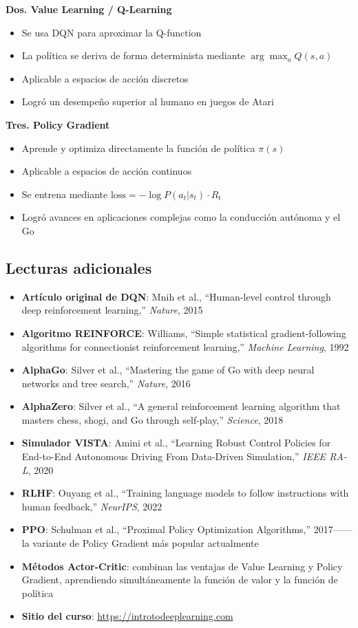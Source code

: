 \documentclass[a4paper]{article}
\begin{document}
\textbf{Dos. Value Learning / Q-Learning}
\begin{itemize}
    \item Se usa DQN para aproximar la Q-function
    \item La política se deriva de forma determinista mediante $\arg\max_a Q(s,a)$
    \item Aplicable a espacios de acción discretos
    \item Logró un desempeño superior al humano en juegos de Atari
\end{itemize}

\textbf{Tres. Policy Gradient}
\begin{itemize}
    \item Aprende y optimiza directamente la función de política $\pi(s)$
    \item Aplicable a espacios de acción continuos
    \item Se entrena mediante $\text{loss} = -\log P(a_t|s_t) \cdot R_t$
    \item Logró avances en aplicaciones complejas como la conducción autónoma y el Go
\end{itemize}

\subsection{Lecturas adicionales}

\begin{itemize}
    \item \textbf{Artículo original de DQN}: Mnih et al., ``Human-level control through deep reinforcement learning,'' \textit{Nature}, 2015
    \item \textbf{Algoritmo REINFORCE}: Williams, ``Simple statistical gradient-following algorithms for connectionist reinforcement learning,'' \textit{Machine Learning}, 1992
    \item \textbf{AlphaGo}: Silver et al., ``Mastering the game of Go with deep neural networks and tree search,'' \textit{Nature}, 2016
    \item \textbf{AlphaZero}: Silver et al., ``A general reinforcement learning algorithm that masters chess, shogi, and Go through self-play,'' \textit{Science}, 2018
    \item \textbf{Simulador VISTA}: Amini et al., ``Learning Robust Control Policies for End-to-End Autonomous Driving From Data-Driven Simulation,'' \textit{IEEE RA-L}, 2020
    \item \textbf{RLHF}: Ouyang et al., ``Training language models to follow instructions with human feedback,'' \textit{NeurIPS}, 2022
    \item \textbf{PPO}: Schulman et al., ``Proximal Policy Optimization Algorithms,'' 2017------la variante de Policy Gradient más popular actualmente
    \item \textbf{Métodos Actor-Critic}: combinan las ventajas de Value Learning y Policy Gradient, aprendiendo simultáneamente la función de valor y la función de política
    \item \textbf{Sitio del curso}: \url{https://introtodeeplearning.com}
\end{itemize}
\end{document}
